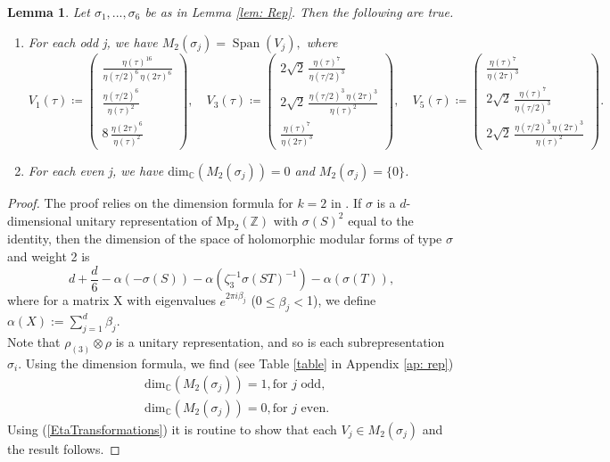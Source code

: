 \documentclass[11pt,reqno]{amsart}
\newtheorem{lemma}[theorem]{Lemma}
\newcommand{\C}{\mathbb{C}}
\renewcommand{\=}{\;=\;}
\theoremstyle{myremark}
\newcommand{\Span}{\operatorname{Span}}
\begin{document}
\begin{lemma}\label{lem: dim}
Let $\sigma_1,...,\sigma_6$ be as in Lemma \ref{lem: Rep}. 
Then the following are true.
\begin{enumerate}
\renewcommand{\labelenumi}{\textup{(\arabic{enumi})}}
\item For each odd j, we have
$
M_2(\sigma_j)= \Span(V_j),
$
where 
\[
V_1(\tau) \coloneqq 
\begin{pmatrix}
\frac{\eta \left(\tau \right)^{16}}{\eta\left(\tau/2\right)^{6}\, \eta\left(2 \tau \right)^{6}}\\
\frac{\eta\left(\tau/2\right)^{6}}{\eta\left(\tau \right)^{2}}\\
8\,\frac{\eta \left(2 \tau \right)^{6}}{\eta \left(\tau \right)^{2}}
\end{pmatrix},
\quad
V_3(\tau) \coloneqq
\begin{pmatrix}
2\sqrt{2}\,\frac{\eta \left(\tau \right)^{7} }{\eta\left(\tau/2\right)^{3}}\\
2\sqrt{2}\,\frac{\eta\left(\tau/2\right)^{3}\, \eta\left(2 \tau \right)^{3}}{\eta\left(\tau \right)^{2}}\\
\frac{\eta \left(\tau \right)^{7}}{\eta \left(2 \tau \right)^{3}}
\end{pmatrix},
\quad
V_5(\tau) \coloneqq
\begin{pmatrix}
\frac{\eta \left(\tau \right)^{7}}{\eta \left(2 \tau \right)^{3}}\\
2\sqrt{2}\,\frac{\eta \left(\tau \right)^{7}}{\eta\left(\tau/2\right)^{3}}\\
2\sqrt{2}\,\frac{\eta\left(\tau/2\right)^{3} \, \eta \left(2 \tau \right)^{3}}{\eta \left(\tau \right)^{2}}
\end{pmatrix}.
\]
\item For each even j, we have $\mathrm{dim}_\C\left(M_2(\sigma_j)\right)=0$ and $M_2(\sigma_j)=\{0\}$.
\end{enumerate}
\end{lemma}
\begin{proof}
The proof relies on the dimension formula for $k=2$ in 
\cite[p.228]{BR99}. 
If $\sigma$ is a $d$-dimensional unitary representation 
of $\mathrm{Mp}_{2}(\mathbb{Z})$ with $\sigma(S)^2$ equal to the identity, 
then the dimension of the space of holomorphic modular forms of type 
$\sigma$ and weight 2 is
\[
d+\frac{d}{6}-\alpha(-\sigma(S))-\alpha(\zeta_3^{-1}\sigma(ST)^{-1})-\alpha(\sigma(T)),
\]
where for a matrix X with eigenvalues $e^{2\pi i\beta_j}$ \!(0$\leq\beta_j<$1), we define $\alpha(X):=\sum_{j=1}^d\beta_j$.   
\\
Note that $\rho_{(3)}\!\otimes\rho$ is a unitary representation, and so is
each subrepresentation $\sigma_i$. 
Using the dimension formula, we find 
(see Table \ref{table} in Appendix \ref{ap: rep})
\begin{align*}
&
\text{dim}_\C\left(M_2(\sigma_j)\right)=1, \text{for $j$ odd},
\\&
\text{dim}_\C\left(M_2(\sigma_j)\right)=0, \text{for $j$ even}.
\end{align*}
Using (\ref{EtaTransformations}) it is routine to show that each
$V_j \in M_2(\sigma_j)$ and the result follows.
\end{proof}
\end{document}
